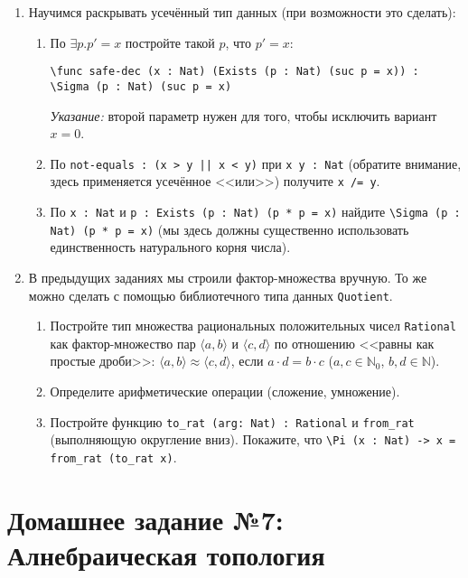 \documentclass[10pt,a4paper,oneside]{article}
\begin{document}
\begin{enumerate}
\item Научимся раскрывать усечённый тип данных (при возможности это сделать):
\begin{enumerate}
\item По $\exists p.p' = x$ постройте такой $p$, что $p' = x$: 
\begin{verbatim}\func safe-dec (x : Nat) (Exists (p : Nat) (suc p = x)) : \Sigma (p : Nat) (suc p = x)\end{verbatim}
\emph{Указание: } второй параметр нужен для того, чтобы исключить вариант $x = 0$.
\item По \verb!not-equals : (x > y || x < y)! при \verb!x y : Nat! 
(обратите внимание, здесь применяется усечённое <<или>>) получите \verb!x /= y!.
\item По \verb!x : Nat! и \verb!p : Exists (p : Nat) (p * p = x)! найдите
\verb!\Sigma (p : Nat) (p * p = x)! (мы здесь должны существенно использовать единственность натурального корня числа).
\end{enumerate}

\item В предыдущих заданиях мы строили фактор-множества вручную. То же можно сделать с помощью библиотечного типа данных \verb!Quotient!.
\begin{enumerate}
\item Постройте тип множества рациональных положительных чисел \verb!Rational! как фактор-множество пар $\langle a,b \rangle$ и $\langle c,d \rangle$
по отношению <<равны как простые дроби>>:
$\langle a, b \rangle \approx \langle c, d \rangle$, если $a\cdot d = b \cdot c$ ($a,c \in \mathbb{N}_0$, $b,d \in \mathbb{N}$).
\item Определите арифметические операции (сложение, умножение).
\item Постройте функцию \verb!to_rat (arg: Nat) : Rational! и \verb!from_rat! (выполняющую округление вниз). Покажите, что 
\verb!\Pi (x : Nat) -> x = from_rat (to_rat x)!.
\end{enumerate}
\end{enumerate}

\section*{Домашнее задание №7: Алнебраическая топология}
\end{document}
